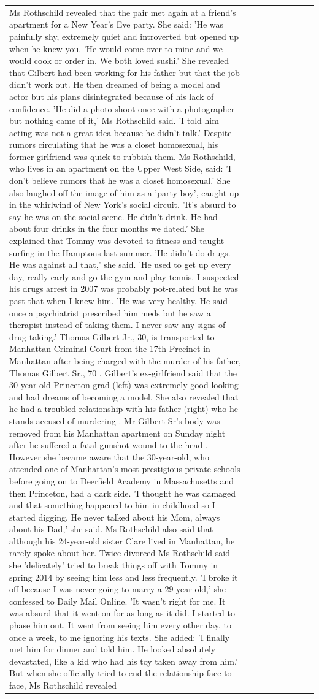 \begin{table}[H]
\begin{tabular}{lllrlllll}
Ms Rothschild revealed that the pair met again at a friend’s apartment for a New Year’s Eve party. She said: 'He was painfully shy, extremely quiet and introverted but opened up when he knew you. 'He would come over to mine and we would cook or order in. We both loved sushi.' She revealed that Gilbert had been working for his father but that the job didn't work out. He then dreamed of being a model and actor but his plans disintegrated because of his lack of confidence. 'He did a photo-shoot once with a photographer but nothing came of it,' Ms Rothschild said. 'I told him acting was not a great idea because he didn’t talk.' Despite rumors circulating that he was a closet homosexual, his former girlfriend was quick to rubbish them. Ms Rothschild, who lives in an apartment on the Upper West Side, said: 'I don’t believe rumors that he was a closet homosexual.' She also laughed off the image of him as a 'party boy', caught up in the whirlwind of New York's social circuit. 'It’s absurd to say he was on the social scene. He didn’t drink. He had about four drinks in the four months we dated.' She explained that Tommy was devoted to fitness and taught surfing in the Hamptons last summer. 'He didn’t do drugs. He was against all that,' she said. 'He used to get up every day, really early and go the gym and play tennis. I suspected his drugs arrest in 2007 was probably pot-related but he was past that when I knew him. 'He was very healthy. He said once a psychiatrist prescribed him meds but he saw a therapist instead of taking them. I never saw any signs of drug taking.' Thomas Gilbert Jr., 30, is transported to Manhattan Criminal Court from the 17th Precinct in Manhattan after being charged with the murder of his father, Thomas Gilbert Sr., 70 . Gilbert's ex-girlfriend said that the 30-year-old Princeton grad (left) was extremely good-looking and had dreams of becoming a model. She also revealed that he had a troubled relationship with his father (right) who he stands accused of murdering . Mr Gilbert Sr's body was removed from his Manhattan apartment on Sunday night after he suffered a fatal gunshot wound to the head . However she became aware that the 30-year-old, who attended one of Manhattan's most prestigious private schools before going on to Deerfield Academy in Massachusetts and then Princeton, had a dark side. 'I thought he was damaged and that something happened to him in childhood so I started digging. He never talked about his Mom, always about his Dad,' she said. Ms Rothschild also said that although his 24-year-old sister Clare lived in Manhattan, he rarely spoke about her. Twice-divorced Ms Rothschild said she 'delicately' tried to break things off with Tommy in spring 2014 by seeing him less and less frequently. 'I broke it off because I was never going to marry a 29-year-old,' she confessed to Daily Mail Online. 'It wasn’t right for me. It was absurd that it went on for as long as it did. I started to phase him out. It went from seeing him every other day, to once a week, to me ignoring his texts. She added: 'I finally met him for dinner and told him. He looked absolutely devastated, like a kid who had his toy taken away from him.' But when she officially tried to end the relationship face-to-face, Ms Rothschild revealed 
\end{tabular}
\end{table}
